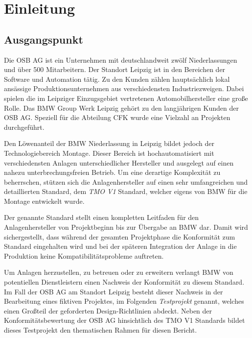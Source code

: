 

\chapter{Einleitung}

\section{Ausgangspunkt}

Die OSB AG ist ein Unternehmen mit deutschlandweit zwölf Niederlassungen und über 500 Mitarbeitern. Der Standort Leipzig ist in den Bereichen der Software und Automation tätig. Zu den Kunden zählen hauptsächlich lokal ansässige Produktionsunternehmen aus verschiedensten Industriezweigen. Dabei spielen die im Leipziger Einzugsgebiet vertretenen Automobilhersteller eine große Rolle.
Das BMW Group Werk Leipzig gehört zu den langjährigen Kunden der OSB AG. Speziell für die Abteilung CFK wurde eine Vielzahl an Projekten durchgeführt.

Den Löwenanteil der BMW Niederlassung in Leipzig bildet jedoch der Technologiebereich Montage. Dieser Bereich ist hochautomatisiert mit verschiedensten Anlagen unterschiedlicher Hersteller und ausgelegt auf einen nahezu unterbrechungsfreien Betrieb. Um eine derartige Komplexität zu beherrschen, stützen sich die Anlagenhersteller auf einen sehr umfangreichen und detaillierten Standard, dem \emph{TMO V1} Standard, welcher eigens von BMW für die Montage entwickelt wurde.

Der genannte Standard stellt einen kompletten Leitfaden für den Anlagenhersteller von Projektbeginn bis zur Übergabe an BMW dar. Damit wird sichergestellt, dass während der gesamten Projektphase die Konformität zum Standard eingehalten wird und bei der späteren Integration der Anlage in die Produktion keine Kompatibilitätsprobleme auftreten.

Um Anlagen herzustellen, zu betreuen oder zu erweitern verlangt BMW von potentiellen Dienstleistern einen Nachweis der Konformität zu diesem Standard. Im Fall der OSB AG am Standort Leipzig besteht dieser Nachweis in der Bearbeitung eines fiktiven Projektes, im Folgenden \emph{Testprojekt} genannt, welches einen Großteil der geforderten Design-Richtlinien abdeckt. Neben der Konformitätsbewertung der OSB AG hinsichtlich des TMO V1 Standards bildet dieses Testprojekt den thematischen Rahmen für diesen Bericht.


